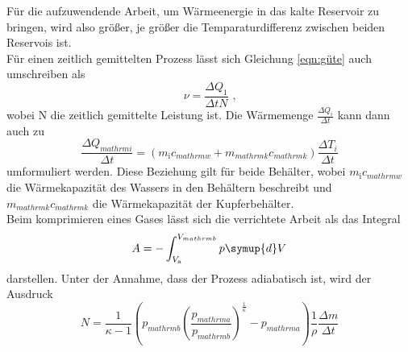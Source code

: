 Für die aufzuwendende Arbeit, um Wärmeenergie in das kalte Reservoir zu bringen, wird also größer, je größer die Temparaturdifferenz
zwischen beiden Reservois ist. \\
\noindent Für einen zeitlich gemittelten Prozess lässt sich Gleichung \ref{eqn:güte} auch umschreiben als
\begin{equation}
    \nu=\frac{\Delta Q_1}{\Delta tN} \text{ ,}
\end{equation}
wobei N die zeitlich gemittelte Leistung ist. Die Wärmemenge $\frac{\Delta Q_i}{\Delta t}$ kann dann auch zu
\begin{equation}
    \frac{\Delta Q_{mathrm{i}}}{\Delta t}=(m_{\mathrm{i}}c_{mathrm{w}}+m_{mathrm{k}}c_{mathrm{k}})\frac{\Delta T_i}{\Delta t}
    \label{eqn:wärmemenge}
\end{equation}
umformuliert werden. Diese Beziehung gilt für beide Behälter, wobei $m_{\mathrm{i}}c_{mathrm{w}}$ die Wärmekapazität des Wassers
in den Behältern beschreibt und $m_{mathrm{k}}c_{mathrm{k}}$ die Wärmekapazität der Kupferbehälter.\\

\noindent Beim komprimieren eines Gases lässt sich die verrichtete Arbeit als das Integral
\begin{equation}
    A=-\int_{V_{\mathrm{a}}}^{V_{mathrm{b}}}p \symup{d}V
\end{equation}
darstellen. Unter der Annahme, dass der Prozess adiabatisch ist, wird der Ausdruck
\begin{equation}
    N=\frac{1}{\kappa -1}(p_{mathrm{b}}(\frac{p_{mathrm{a}}}{p_{mathrm{b}}})^{\frac{1}{\kappa}}-p_{mathrm{a}})\frac{1}{\rho}\frac{\Delta m}{\Delta t}
    \label{eqn:leistung}
\end{equation}